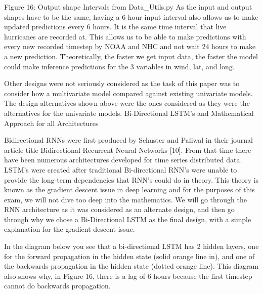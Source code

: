 \documentclass{article}
\begin{document}
Figure 16: Output shape Intervals from Data\_Utils.py
As the input and output shapes have to be the same, having a 6-hour input interval also allows us to make updated predictions every 6 hours. It is the same time interval that live hurricanes are recorded at. This allows us to be able to make predictions with every new recorded timestep by NOAA and NHC and not wait 24 hours to make a new prediction. Theoretically, the faster we get input data, the faster the model could make inference predictions for the 3 variables in wind, lat, and long. 

Other designs were not seriously considered as the task of this paper was to consider how a multivariate model compared against existing univariate models. The design alternatives shown above were the ones considered as they were the alternatives for the univariate models.
Bi-Directional LSTM’s and Mathematical Approach for all Architectures

Bidirectional RNNs were first produced by Schuster and Paliwal in their journal article title Bidirectional Recurrent Neural Networks [10]. From that time there have been numerous architectures developed for time series distributed data. LSTM’s were created after traditional Bi-directional RNN’s were unable to provide the long-term dependencies that RNN’s could do in theory. This theory is known as the gradient descent issue in deep learning and for the purposes of this exam, we will not dive too deep into the mathematics. We will go through the RNN architecture as it was considered as an alternate design, and then go through why we chose a Bi-Directional LSTM as the final design, with a simple explanation for the gradient descent issue.

In the diagram below you see that a bi-directional LSTM has 2 hidden layers, one for the forward propagation in the hidden state (solid orange line in), and one of the backwards propagation in the hidden state (dotted orange line). This diagram also shows why, in Figure 16, there is a lag of 6 hours because the first timestep cannot do backwards propagation.
\end{document}
